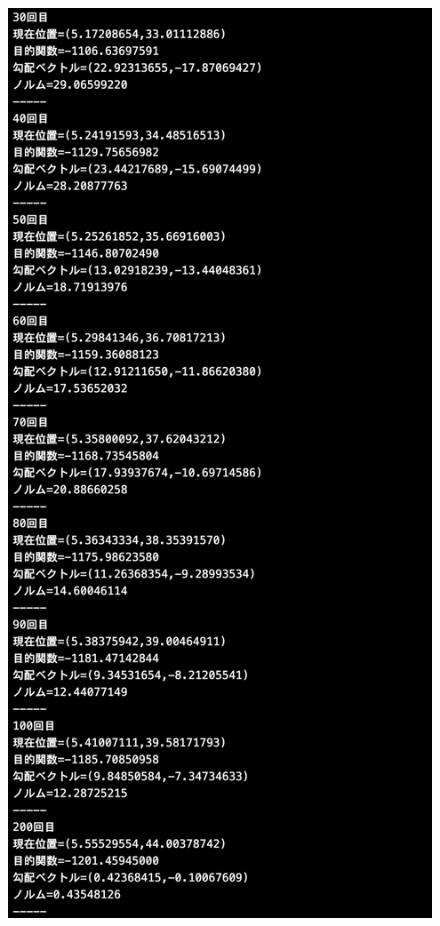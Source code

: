 \documentclass[12pt]{jarticle}
\begin{document}
\begin{figure}[h]
    \begin{minipage}{0.5\hsize}
        \begin{center}
            \includegraphics[scale=0.2]{kadai1_2s_out1_3_2.png}
        \end{center}

\end{minipage}
\end{figure}
\end{document}
